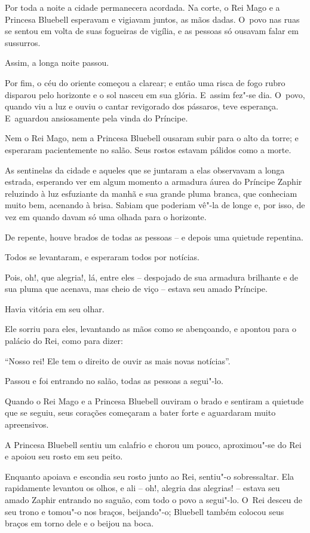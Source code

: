 Por toda a noite a cidade permanecera acordada. Na corte, o Rei Mago e a
Princesa Bluebell esperavam e vigiavam juntos, as mãos dadas. O~povo nas
ruas se sentou em volta de suas fogueiras de vigília, e as pessoas só
ousavam falar em sussurros.

Assim, a longa noite passou.

Por fim, o céu do oriente começou a clarear; e então uma risca de fogo
rubro disparou pelo horizonte e o sol nasceu em sua glória. E~assim
fez"-se dia. O~povo, quando viu a luz e ouviu o cantar revigorado dos
pássaros, teve esperança. E~aguardou ansiosamente pela vinda do
Príncipe.

Nem o Rei Mago, nem a Princesa Bluebell ousaram subir para o alto da
torre; e esperaram pacientemente no salão. Seus rostos estavam pálidos
como a morte.

As sentinelas da cidade e aqueles que se juntaram a elas observavam a
longa estrada, esperando ver em algum momento a armadura áurea do
Príncipe Zaphir reluzindo à luz esfuziante da manhã e sua grande pluma
branca, que conheciam muito bem, acenando à brisa. Sabiam que poderiam
vê"-la de longe e, por isso, de vez em quando davam só uma olhada para o
horizonte.

De repente, houve brados de todas as pessoas -- e depois uma quietude
repentina.

Todos se levantaram, e esperaram todos por notícias.

Pois, oh!, que alegria!, lá, entre eles -- despojado de sua armadura
brilhante e de sua pluma que acenava, mas cheio de viço -- estava seu
amado Príncipe.

Havia vitória em seu olhar.

Ele sorriu para eles, levantando as mãos como se abençoando, e apontou
para o palácio do Rei, como para dizer:

``Nosso rei! Ele tem o direito de ouvir as mais novas notícias''.

Passou e foi entrando no salão, todas as pessoas a segui"-lo.

\smallskip
Quando o Rei Mago e a Princesa Bluebell ouviram o brado e sentiram a
quietude que se seguiu, seus corações começaram a bater forte e
aguardaram muito apreensivos.

A Princesa Bluebell sentiu um calafrio e chorou um pouco, aproximou"-se
do Rei e apoiou seu rosto em seu peito.

Enquanto apoiava e escondia seu rosto junto ao Rei, sentiu"-o
sobressaltar. Ela rapidamente levantou os olhos, e ali -- oh!, alegria
das alegrias! -- estava seu amado Zaphir entrando no saguão, com todo o
povo a segui"-lo. O~Rei desceu de seu trono e tomou"-o nos braços,
beijando"-o; Bluebell também colocou seus braços em torno dele e o beijou
na boca.

